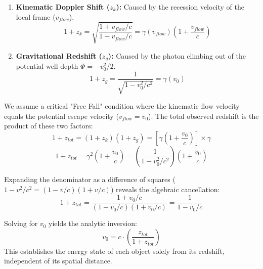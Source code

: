 \documentclass[11pt]{article}
\begin{document}
\begin{enumerate}
    \item \textbf{Kinematic Doppler Shift ($z_k$):} Caused by the recession velocity of the local frame ($v_{flow}$).
    \begin{equation}
        1 + z_k = \sqrt{\frac{1+v_{flow}/c}{1-v_{flow}/c}} = \gamma(v_{flow}) \left(1 + \frac{v_{flow}}{c}\right)
    \end{equation}
    \item \textbf{Gravitational Redshift ($z_g$):} Caused by the photon climbing out of the potential well depth $\Phi = -v_0^2/2$.
    \begin{equation}
        1 + z_g = \frac{1}{\sqrt{1 - v_0^2/c^2}} = \gamma(v_0)
    \end{equation}
\end{enumerate}

We assume a critical "Free Fall" condition where the kinematic flow velocity equals the potential escape velocity ($v_{flow} = v_0$). The total observed redshift is the product of these two factors:
\begin{equation}
    1 + z_{tot} = (1 + z_k)(1 + z_g) = \left[ \gamma \left(1 + \frac{v_0}{c}\right) \right] \times \gamma
\end{equation}
\begin{equation}
    1 + z_{tot} = \gamma^2 \left(1 + \frac{v_0}{c}\right) = \left( \frac{1}{1 - v_0^2/c^2} \right) \left(1 + \frac{v_0}{c}\right)
\end{equation}

Expanding the denominator as a difference of squares ($1 - v^2/c^2 = (1-v/c)(1+v/c)$) reveals the algebraic cancellation:
\begin{equation}
    1 + z_{tot} = \frac{1 + v_0/c}{(1 - v_0/c)(1 + v_0/c)} = \frac{1}{1 - v_0/c}
\end{equation}

Solving for $v_0$ yields the analytic inversion:
\begin{equation}
    v_0 = c \cdot \left( \frac{z_{tot}}{1 + z_{tot}} \right)
\end{equation}
This establishes the energy state of each object solely from its redshift, independent of its spatial distance.
\end{document}
